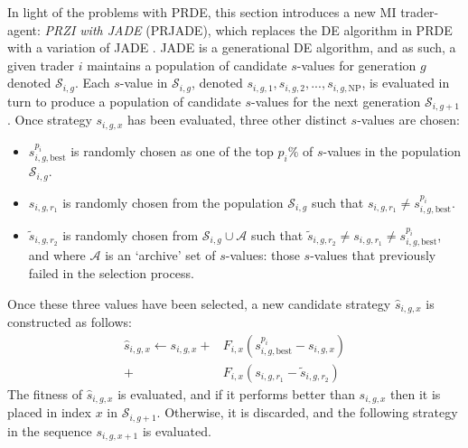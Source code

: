 \documentclass[a4paper,twoside]{article}
\begin{document}
In light of the problems with PRDE, this section introduces a new MI trader-agent: \textit{PRZI with JADE} (PRJADE), which replaces the DE algorithm in PRDE with a variation of JADE \cite{ZhangSanderson}.
JADE is a generational DE algorithm, and as such, a given trader $i$ maintains a population of candidate $s$-values for generation $g$ denoted $\mathcal{S}_{i,g}$.
Each $s$-value in $\mathcal{S}_{i,g}$, denoted $s_{i,g,1}, s_{i,g,2}, ..., s_{i,g,\mathrm{NP}}$, is evaluated in turn to produce a population of candidate $s$-values for the next generation $\mathcal{S}_{i,g+1}$.
Once strategy $s_{i,g,x}$ has been evaluated, three other distinct $s$-values are chosen:
\begin{itemize}
    \item $s^{p_i}_{i,g,\text{best}}$ is randomly chosen as one of the top $p_i\%$ of $s$-values in the population $\mathcal{S}_{i,g}$.
    \item $s_{i,g,r_1}$ is randomly chosen from the population $\mathcal{S}_{i,g}$ such that $s_{i,g,r_1}\ne s^{p_i}_{i,g,\text{best}}$.
    \item $\tilde{s}_{i,g,r_2}$ is randomly chosen from $\mathcal{S}_{i,g}\cup\mathcal{A}$ such that $\tilde{s}_{i,g,r_2}\ne s_{i,g,r_1}\ne s^{p_i}_{i,g,\text{best}}$, and where $\mathcal{A}$ is an `archive' set of $s$-values: those $s$-values that previously failed in the selection process.
\end{itemize}

Once these three values have been selected, a new candidate strategy $\hat{s}_{i,g,x}$ is constructed as follows:
\begin{equation}
\begin{split}
    \hat{s}_{i,g,x}\leftarrow s_{i,g,x}+&F_{i,x}\left(s^{p_i}_{i,g,\text{best}} - s_{i,g,x}\right)\\ + &F_{i,x}\left(s_{i,g,r_1} - \tilde{s}_{i,g,r_2}\right)
\end{split}
\end{equation}
The fitness of $\hat{s}_{i,g,x}$ is evaluated, and if it performs better than $s_{i,g,x}$ then it is placed in index $x$ in $\mathcal{S}_{i,g+1}$. 
Otherwise, it is discarded, and the following strategy in the sequence $s_{i,g,x+1}$ is evaluated.
\end{document}
